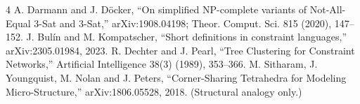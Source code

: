 \documentclass[11pt]{article}
\begin{document}
\begin{thebibliography}{4}
 A. Darmann and J. D\"ocker,
``On simplified NP-complete variants of Not-All-Equal 3-Sat and 3-Sat,''
arXiv:1908.04198; Theor. Comput. Sci. 815 (2020), 147--152.
 J. Bul\'in and M. Kompatscher,
``Short definitions in constraint languages,'' arXiv:2305.01984, 2023.
 R. Dechter and J. Pearl,
``Tree Clustering for Constraint Networks,'' Artificial Intelligence 38(3)
(1989), 353--366.
 M. Sitharam, J. Youngquist, M. Nolan and J. Peters,
``Corner-Sharing Tetrahedra for Modeling Micro-Structure,''
arXiv:1806.05528, 2018.  (Structural analogy only.)
\end{thebibliography}
\end{document}
